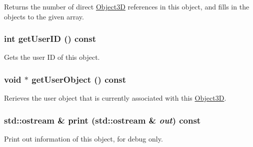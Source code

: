 Returns the number of direct \hyperlink{classm3g_1_1Object3D}{Object3D} references in this object, and fills in the objects to the given array. \hypertarget{classm3g_1_1Object3D_b8d9067364251d0208fcdc502d394e2c}{
\subsubsection[{getUserID}]{\setlength{\rightskip}{0pt plus 5cm}int getUserID () const}}
\label{classm3g_1_1Object3D_b8d9067364251d0208fcdc502d394e2c}


Gets the user ID of this object. \hypertarget{classm3g_1_1Object3D_a9b8541216c1fa7792617218a5fb6672}{
\subsubsection[{getUserObject}]{\setlength{\rightskip}{0pt plus 5cm}void $\ast$ getUserObject () const}}
\label{classm3g_1_1Object3D_a9b8541216c1fa7792617218a5fb6672}


Rerieves the user object that is currently associated with this \hyperlink{classm3g_1_1Object3D}{Object3D}. \hypertarget{classm3g_1_1Object3D_6fea17fa1532df3794f8cb39cb4f911f}{
\subsubsection[{print}]{\setlength{\rightskip}{0pt plus 5cm}std::ostream \& print (std::ostream \& {\em out}) const}}
\label{classm3g_1_1Object3D_6fea17fa1532df3794f8cb39cb4f911f}


Print out information of this object, for debug only. 

